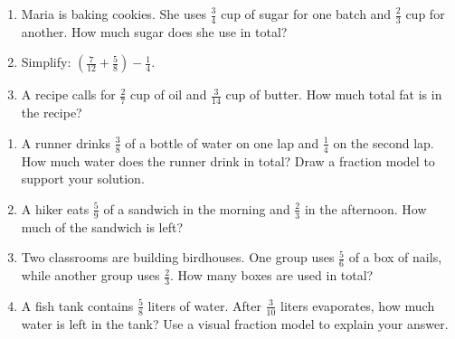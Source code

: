 \documentclass[12pt]{article}
\begin{document}
\begin{tcolorbox}[colframe=black!60, colback=white, 
coltitle=black, colbacktitle=black!15, fonttitle=\bfseries\Large, 
title=Exercises, halign title=center, left=10pt, right=10pt, top=10pt, bottom=60pt]
\begin{enumerate}[itemsep=3em]
\begin{center}
        \vspace{0.5em}

    \end{center}

    \item Maria is baking cookies. She uses \( \frac{3}{4} \) cup of sugar for one batch and \( \frac{2}{3} \) cup for another. How much sugar does she use in total?

    \item Simplify: \( \left( \frac{7}{12} + \frac{5}{8} \right) - \frac{1}{4} \).

    \item A recipe calls for \( \frac{2}{7} \) cup of oil and \( \frac{3}{14} \) cup of butter. How much total fat is in the recipe? \vspace{1cm}


\end{enumerate}
\end{tcolorbox}


\begin{tcolorbox}[colframe=black!60, colback=white, 
coltitle=black, colbacktitle=black!15, fonttitle=\bfseries\Large, 
title=Problems, halign title=center, left=10pt, right=10pt, top=10pt, bottom=100pt]
\begin{enumerate}[start=9, itemsep=6em]
    \item A runner drinks \( \frac{3}{8} \) of a bottle of water on one lap and \( \frac{1}{4} \) on the second lap. How much water does the runner drink in total? Draw a fraction model to support your solution.

    \item A hiker eats \( \frac{5}{9} \) of a sandwich in the morning and \( \frac{2}{3} \) in the afternoon. How much of the sandwich is left?

    \item Two classrooms are building birdhouses. One group uses \( \frac{5}{6} \) of a box of nails, while another group uses \( \frac{2}{3} \). How many boxes are used in total?

    \item A fish tank contains \( \frac{5}{8} \) liters of water. After \( \frac{3}{10} \) liters evaporates, how much water is left in the tank? Use a visual fraction model to explain your answer.
\end{enumerate}
\end{tcolorbox}
\end{document}
